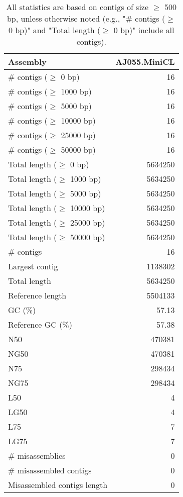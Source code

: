 \documentclass[12pt,a4paper]{article}
\begin{document}
\begin{table}[ht]
\begin{center}
\caption{All statistics are based on contigs of size $\geq$ 500 bp, unless otherwise noted (e.g., "\# contigs ($\geq$ 0 bp)" and "Total length ($\geq$ 0 bp)" include all contigs).}
\begin{tabular}{|l*{1}{|r}|}
\hline
Assembly & AJ055.MiniCL \\ \hline
\# contigs ($\geq$ 0 bp) & 16 \\ \hline
\# contigs ($\geq$ 1000 bp) & 16 \\ \hline
\# contigs ($\geq$ 5000 bp) & 16 \\ \hline
\# contigs ($\geq$ 10000 bp) & 16 \\ \hline
\# contigs ($\geq$ 25000 bp) & 16 \\ \hline
\# contigs ($\geq$ 50000 bp) & 16 \\ \hline
Total length ($\geq$ 0 bp) & 5634250 \\ \hline
Total length ($\geq$ 1000 bp) & 5634250 \\ \hline
Total length ($\geq$ 5000 bp) & 5634250 \\ \hline
Total length ($\geq$ 10000 bp) & 5634250 \\ \hline
Total length ($\geq$ 25000 bp) & 5634250 \\ \hline
Total length ($\geq$ 50000 bp) & 5634250 \\ \hline
\# contigs & 16 \\ \hline
Largest contig & 1138302 \\ \hline
Total length & 5634250 \\ \hline
Reference length & 5504133 \\ \hline
GC (\%) & 57.13 \\ \hline
Reference GC (\%) & 57.38 \\ \hline
N50 & 470381 \\ \hline
NG50 & 470381 \\ \hline
N75 & 298434 \\ \hline
NG75 & 298434 \\ \hline
L50 & 4 \\ \hline
LG50 & 4 \\ \hline
L75 & 7 \\ \hline
LG75 & 7 \\ \hline
\# misassemblies & 0 \\ \hline
\# misassembled contigs & 0 \\ \hline
Misassembled contigs length & 0 \\ \hline

\end{tabular}
\end{center}
\end{table}
\end{document}
